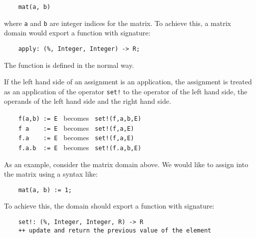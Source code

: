 \begin{small}
\begin{verbatim}
    mat(a, b)
\end{verbatim}
\end{small}

where {\tt a} and {\tt b} are integer indices for the matrix. To
achieve this, a matrix domain would export a function with signature:

\begin{small}\begin{verbatim}
    apply: (%, Integer, Integer) -> R;
\end{verbatim}
\end{small}

The function is defined in the normal way.


If the left hand side of an assignment is an application, the
assignment is treated as an application of the operator {\tt set!}  to
the operator of the left hand side, the operands of the left hand side
and the right hand side.

\verb^    f(a,b) := E ^ becomes \verb^ set!(f,a,b,E)^ \\
\verb^    f a    := E ^ becomes \verb^ set!(f,a,E)^   \\
\verb^    f.a    := E ^ becomes \verb^ set!(f,a,E)^   \\
\verb^    f.a.b  := E ^ becomes \verb^ set!(f.a,b,E)^

As an example, consider the matrix domain above. We would like to assign
into the matrix using a syntax like:

\begin{small}\begin{verbatim}
	mat(a, b) := 1;
\end{verbatim}
\end{small}

To achieve this, the domain should export a function with signature:

\begin{small}\begin{verbatim}
    set!: (%, Integer, Integer, R) -> R
    ++ update and return the previous value of the element
\end{verbatim}
\end{small}

